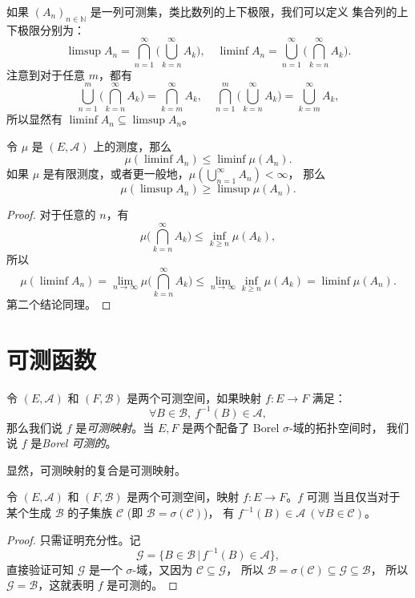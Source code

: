 \documentclass[fontset=none]{Notes}
\begin{document}
如果 $(A_n)_{n\in \mathbb{N}}$ 是一列可测集，类比数列的上下极限，我们可以定义
集合列的上下极限分别为：
\[
  \limsup A_n=\bigcap_{n=1}^\infty\biggl(\bigcup_{k=n}^\infty A_k\biggr),\quad
  \liminf A_n=\bigcup_{n=1}^\infty\biggl(\bigcap_{k=n}^\infty A_k\biggr).
\]
注意到对于任意 $m$，都有
\[
  \bigcup_{n=1}^m\biggl(\bigcap_{k=n}^\infty A_k\biggr)
  =\bigcap_{k=m}^\infty A_k,\quad 
  \bigcap_{n=1}^m\biggl(\bigcup_{k=n}^\infty A_k\biggr)=\bigcup_{k=m}^\infty A_k,
\]
所以显然有 $\liminf A_n\subseteq \limsup A_n$。

\begin{lemma}
  令 $\mu$ 是 $(E,\mathcal{A})$ 上的测度，那么
  \[
    \mu(\liminf A_n)\leq \liminf \mu(A_n).
  \]
  如果 $\mu$ 是有限测度，或者更一般地，$\mu\left(\bigcup_{n=1}^\infty A_n\right)<\infty$，
  那么
  \[
    \mu(\limsup A_n)\geq\limsup\mu(A_n).
  \]
\end{lemma}
\begin{proof}
  对于任意的 $n$，有 
  \[
    \mu\biggl(\bigcap_{k=n}^\infty A_k\biggr)\leq \inf_{k\geq n}\mu(A_k),
  \]
  所以
  \[
    \mu(\liminf A_n)=\lim_{n\to\infty}\mu\biggl(\bigcap_{k=n}^\infty A_k\biggr)
    \leq \lim_{n\to\infty}\inf_{k\geq n}\mu(A_k)=\liminf \mu(A_n).
  \]
  第二个结论同理。
\end{proof}

\section{可测函数}

\begin{definition}
  令 $(E,\mathcal{A})$ 和 $(F,\mathcal{B})$ 是两个可测空间，如果映射 $f:E\to F$ 满足：
  \[
    \forall B\in \mathcal{B},\  f^{-1}(B)\in \mathcal{A},
  \]
  那么我们说 $f$ 是\emph{可测映射}。当 $E,F$ 是两个配备了 Borel $\sigma$-域的拓扑空间时，
  我们说 $f$ 是\emph{Borel 可测的}。
\end{definition}

显然，可测映射的复合是可测映射。

\begin{proposition}
  令 $(E,\mathcal{A})$ 和 $(F,\mathcal{B})$ 是两个可测空间，映射 $f:E\to F$。$f$ 可测
  当且仅当对于某个生成 $\mathcal{B}$ 的子集族 $\mathcal{C}$ (即 $\mathcal{B}=\sigma(\mathcal{C})$)，
  有 $f^{-1}(B)\in \mathcal{A}\ (\forall B\in \mathcal{C})$。
\end{proposition}
\begin{proof}
  只需证明充分性。记
  \[
    \mathcal{G}=\{B\in \mathcal{B}\,|\, f^{-1}(B)\in \mathcal{A}\},
  \]
  直接验证可知 $\mathcal{G}$ 是一个 $\sigma$-域，又因为 $\mathcal{C}\subseteq \mathcal{G}$，
  所以 $\mathcal{B}=\sigma(\mathcal{C})\subseteq \mathcal{G}\subseteq \mathcal{B}$，
  所以 $\mathcal{G}=\mathcal{B}$，这就表明 $f$ 是可测的。
\end{proof}
\end{document}
